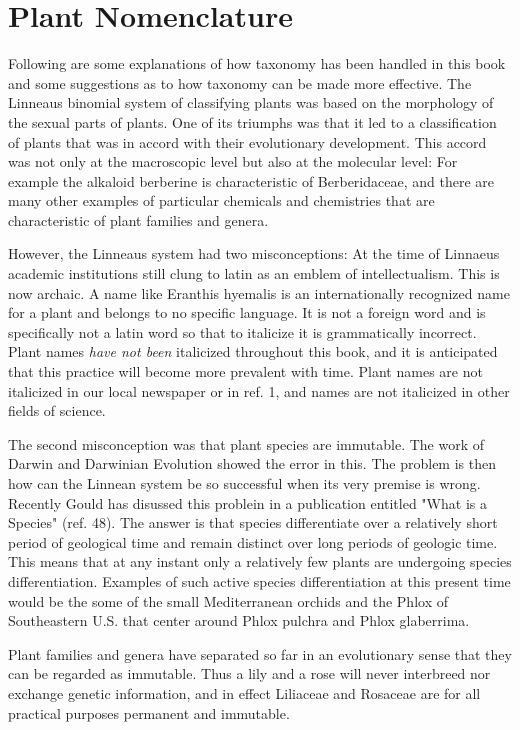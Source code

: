 \chapter{Plant Nomenclature}

Following are some explanations of how taxonomy has been handled in this
book and some suggestions as to how taxonomy can be made more effective. The
Linneaus binomial system of classifying plants was based on the morphology of the
sexual parts of plants. One of its triumphs was that it led to a classification of plants
that was in accord with their evolutionary development. This accord was not only at
the macroscopic level but also at the molecular level: For example the alkaloid
berberine is characteristic of Berberidaceae, and there are many other examples of
particular chemicals and chemistries that are characteristic of plant families and
genera.

However, the Linneaus system had two misconceptions: At the time of
Linnaeus academic institutions still clung to latin as an emblem of intellectualism. This
is now archaic. A name like Eranthis hyemalis is an internationally recognized name
for a plant and belongs to no specific language. It is not a foreign word and is
specifically not a latin word so that to italicize it is grammatically incorrect. Plant
names \textit{have not been} italicized throughout this book, and it is anticipated that this
practice will become more prevalent with time. Plant names are not italicized in our
local newspaper or in ref. 1, and names are not italicized in other fields of science.

The second misconception was that plant species are immutable. The work of
Darwin and Darwinian Evolution showed the error in this. The problem is then how
can the Linnean system be so successful when its very premise is wrong. Recently
Gould has disussed this problein in a publication entitled "What is a Species" (ref. 48).
The answer is that species differentiate over a relatively short period of geological
time and remain distinct over long periods of geologic time. This means that at any
instant only a relatively few plants are undergoing species differentiation. Examples of
such active species differentiation at this present time would be the some of the small
Mediterranean orchids and the Phlox of Southeastern U.S. that center around Phlox
pulchra and Phlox glaberrima.

Plant families and genera have separated so far in an evolutionary sense that
they can be regarded as immutable. Thus a lily and a rose will never interbreed nor
exchange genetic information, and in effect Liliaceae and Rosaceae are for all
practical purposes permanent and immutable.

